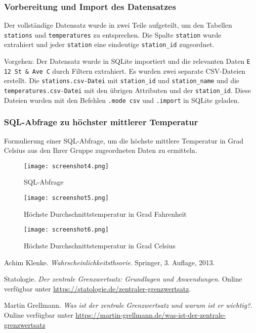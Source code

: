 \documentclass[a4paper,12pt]{article}
\begin{document}
\subsubsection{Vorbereitung und Import des Datensatzes}
Der vollständige Datensatz wurde in zwei Teile aufgeteilt, um den Tabellen \texttt{stations} und \texttt{temperatures} zu entsprechen. Die Spalte \texttt{station} wurde extrahiert und jeder \texttt{station} eine eindeutige \texttt{station\_id} zugeordnet.

Vorgehen:
Der Datensatz wurde in SQLite importiert und die relevanten Daten \texttt{E 12 St \& Ave C} durch Filtern extrahiert. Es wurden zwei separate CSV-Dateien erstellt. Die \texttt{stations.csv-Datei} mit \texttt{station\_id} und \texttt{station\_name} und die \texttt{temperatures.csv-Datei} mit den übrigen Attributen und der \texttt{station\_id}. Diese Dateien wurden mit den Befehlen \texttt{.mode csv} und \texttt{.import} in SQLite geladen.

\subsubsection{SQL-Abfrage zu höchster mittlerer Temperatur}
Formulierung einer SQL-Abfrage, um die höchste mittlere Temperatur in Grad Celsius aus den Ihrer Gruppe zugeordneten Daten zu ermitteln.

\begin{figure}[H]
    \centering
    \texttt{[image: screenshot4.png]} 
    \caption{SQL-Abfrage} 
    \label{fig:screenshot4} 
\end{figure}

\begin{figure}[H]
    \centering
    \texttt{[image: screenshot5.png]} 
    \caption{Höchste Durchschnittstemperatur in Grad Fahrenheit} 
    \label{fig:screenshot5} 
\end{figure}

\begin{figure}[H]
    \centering
    \texttt{[image: screenshot6.png]} 
    \caption{Höchste Durchschnittstemperatur in Grad Celsius} 
    \label{fig:screenshot6} 
\end{figure}

\newpage

\begin{thebibliography}{9}
    Achim Klenke. \textit{Wahrscheinlichkeitstheorie}. Springer, 3. Auflage, 2013.
    
    Statologie. 
    \textit{Der zentrale Grenzwertsatz: Grundlagen und Anwendungen}. Online verfügbar unter \url{https://statologie.de/zentraler-grenzwertsatz}.
    
    Martin Grellmann. 
    \textit{Was ist der zentrale Grenzwertsatz und warum ist er wichtig?}. Online verfügbar unter \url{https://martin-grellmann.de/was-ist-der-zentrale-grenzwertsatz}
\end{thebibliography}
\end{document}
